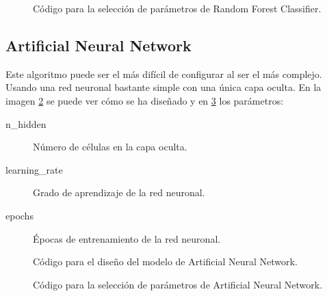 \begin{figure}[H]
\centering
{}
\caption{Código para la selección de parámetros de Random Forest Classifier.}
\label{figure:paramforest}
\end{figure}


\subsection{Artificial Neural Network}
Este algoritmo puede ser el más difícil de configurar al ser el más complejo. Usando una red neuronal bastante simple con una única capa oculta. En la imagen \ref{figure:designann} se puede ver cómo se ha diseñado y en \ref{figure:paramann} los parámetros:
\begin{description}
 \item [n\_hidden] Número de células en la capa oculta.
 \item [learning\_rate] Grado de aprendizaje de la red neuronal.
 \item [epochs] Épocas de entrenamiento de la red neuronal.
\end{description}

\begin{figure}[H]
\centering
{}
\caption{Código para el diseño del modelo de Artificial Neural Network.}
\label{figure:designann}
\end{figure}

\begin{figure}[H]
\centering
{}
\caption{Código para la selección de parámetros de Artificial Neural Network.}
\label{figure:paramann}
\end{figure}